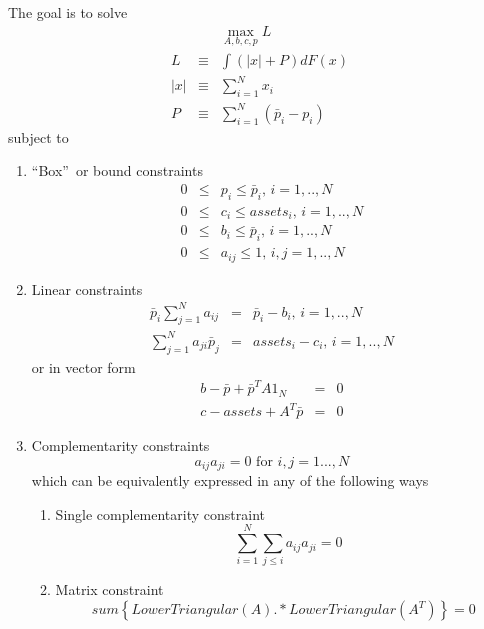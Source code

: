 \documentclass{article}
\begin{document}
The goal is to solve%
\begin{eqnarray*}
&&\max_{A,b,c,p}L \\
L &\equiv &\int \left( \left\vert x\right\vert +P\right) dF\left( x\right) \\
\left\vert x\right\vert &\equiv &\sum_{i=1}^{N}x_{i} \\
P &\equiv &\sum_{i=1}^{N}\left( \bar{p}_{i}-p_{i}\right)
\end{eqnarray*}%
subject to

\begin{enumerate}
\item \textquotedblleft Box\textquotedblright\ or bound constraints%
\begin{eqnarray*}
0 &\leq &p_{i}\leq \bar{p}_{i}\text{, }i=1,..,N \\
0 &\leq &c_{i}\leq assets_{i}\text{, }i=1,..,N \\
0 &\leq &b_{i}\leq \bar{p}_{i}\text{, }i=1,..,N \\
0 &\leq &a_{ij}\leq 1\text{, }i,j=1,..,N
\end{eqnarray*}

\item Linear constraints%
\begin{eqnarray*}
\bar{p}_{i}\sum_{j=1}^{N}a_{ij} &=&\bar{p}_{i}-b_{i}\text{, }i=1,..,N \\
\sum_{j=1}^{N}a_{ji}\bar{p}_{j} &=&assets_{i}-c_{i}\text{, }i=1,..,N
\end{eqnarray*}%
or in vector form%
\begin{eqnarray*}
b-\bar{p}+\bar{p}^{T}A1_{N} &=&0 \\
c-assets+A^{T}\bar{p} &=&0
\end{eqnarray*}

\item Complementarity constraints%
\begin{equation*}
a_{ij}a_{ji}=0\text{ for }i,j=1...,N
\end{equation*}%
which can be equivalently expressed in any of the following ways

\begin{enumerate}
\item Single complementarity constraint%
\begin{equation*}
\text{ }\sum_{i=1}^{N}\sum_{j\leq i}a_{ij}a_{ji}=0
\end{equation*}

\item Matrix constraint%
\begin{equation*}
sum\left\{ LowerTriangular(A).\ast LowerTriangular(A^{T})\right\} =0
\end{equation*}


\end{enumerate}
\end{enumerate}
\end{document}
